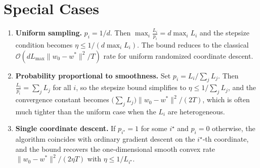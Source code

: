 \documentclass[11pt]{article}
\begin{document}
\section*{Special Cases}
\begin{enumerate}[label=\arabic*.]
\item \textbf{Uniform sampling.} $p_i=1/d$. Then $\max_i\frac{L_i}{p_i}=d\max_i L_i$ and the stepsize condition becomes $\eta\le 1/(d\max_i L_i)$. The bound reduces to the classical $\mathcal O(dL_{\max}\|w_0-w^{*}\|^{2}/T)$ rate for uniform randomized coordinate descent.

\item \textbf{Probability proportional to smoothness.} Set $p_i = L_i/\sum_{j}L_j$. Then $\frac{L_i}{p_i}= \sum_{j}L_j$ for all $i$, so the stepsize bound simplifies to $\eta\le 1/\sum_{j}L_j$, and the convergence constant becomes $\big(\sum_{j}L_j\big)\|w_0-w^{*}\|^{2}/(2T)$, which is often much tighter than the uniform case when the $L_i$ are heterogeneous.

\item \textbf{Single coordinate descent.} If $p_{i^{\star}}=1$ for some $i^{\star}$ and $p_i=0$ otherwise, the algorithm coincides with ordinary gradient descent on the $i^{\star}$‑th coordinate, and the bound recovers the one‑dimensional smooth convex rate $\|w_0-w^{*}\|^{2}/(2\eta T)$ with $\eta\le 1/L_{i^{\star}}$.
\end{enumerate}
\end{document}
